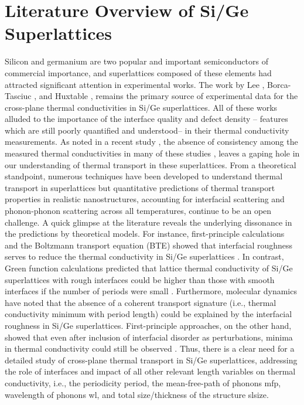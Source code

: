 \section{Literature Overview of Si/Ge Superlattices}
Silicon and germanium are two popular and important semiconductors of commercial importance, and superlattices composed of these elements had attracted significant attention in experimental works. The work by Lee \etal \cite{RN282}, Borca-Tasciuc \etal \cite{RN298}, and Huxtable \etal \cite{RN361,RN297}, remains the primary source of experimental data for the cross-plane thermal conductivities in Si/Ge superlattices. All of these works alluded to the importance of the interface quality and defect density -- features which are still poorly quantified and understood-- in their thermal conductivity measurements. As noted in a recent study \cite{RN544}, the absence of consistency among the measured thermal conductivities in many of these studies \cite{RN282,RN298,RN300}, leaves a gaping hole in our understanding of thermal transport in these superlattices. From a theoretical standpoint, numerous techniques have been developed to understand thermal transport in superlattices \cite{RN266,RN264,RN305,RN306,RN357,RN353} but quantitative predictions of thermal transport properties in realistic nanostructures, accounting for interfacial scattering and phonon-phonon scattering across all temperatures, continue to be an open challenge. A quick glimpse at the literature reveals the underlying dissonance in the predictions by theoretical models. For instance, first-principle calculations and the Boltzmann transport equation (BTE) showed that interfacial roughness serves to reduce the thermal conductivity in Si/Ge superlattices \cite{RN328,RN294,RN169}. In contrast, Green function calculations predicted that lattice thermal conductivity of Si/Ge superlattices with rough interfaces could be higher than those with smooth interfaces if the number of periods were small \cite{RN295}. Furthermore, molecular dynamics \cite{RN319,RN353,RN262} have noted that the absence of a coherent transport signature (i.e., thermal conductivity minimum with period length) could be explained by the interfacial roughness in Si/Ge superlattices. First-principle approaches, on the other hand, showed that even after inclusion of interfacial disorder as perturbations, minima in thermal conductivity could still be observed \cite{RN262}. Thus, there is a clear need for a detailed study of cross-plane thermal transport in Si/Ge superlattices, addressing the role of interfaces and impact of all other relevant length variables on thermal conductivity, i.e., the periodicity \gls{period}, the mean-free-path of phonons \gls{mfp}, wavelength of phonons \gls{wl}, and total size/thickness of the structure \gls{slsize}.

